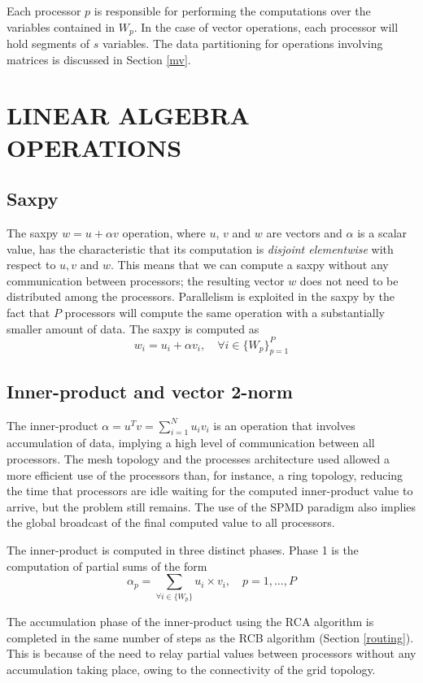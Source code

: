\documentclass{ecai2014}
\begin{document}
Each processor $p$ is responsible for performing the computations over
the variables contained in $W_{p}$. In the case of vector operations,
each processor will hold segments of $s$ variables. The data
partitioning for operations involving matrices is discussed in Section
\ref{mv}.
\section{LINEAR ALGEBRA OPERATIONS}
\label{blas}
\subsection{Saxpy}
\label{saxpy}
The saxpy $w=u+\alpha v$ operation, where $u$, $v$ and $w$ are vectors
and $\alpha$ is a scalar value, has the characteristic that its
computation is \emph{disjoint elementwise} with respect to $u, v$ and
$w$. This means that we can compute a saxpy without any communication
between processors; the resulting vector $w$ does not need to be
distributed among the processors. Parallelism is exploited in the
saxpy by the fact that $P$ processors will compute the same operation
with a substantially smaller amount of data. The saxpy is computed as
\begin{equation}
w_{i}=u_{i}+\alpha v_{i},\quad \forall i\in\{W_{p}\}_{p=1}^{P}
\label{distsaxpy}
\end{equation}
\subsection{Inner-product and vector 2-norm}
\label{utv}
The inner-product $\alpha=u^{T}v=\sum_{i=1}^{N}{u_{i}v_{i}}$ is an
operation that involves accumulation of data, implying a high level of
communication between all processors. The mesh topology and the
processes architecture used allowed a more efficient use of the
processors than, for instance, a ring topology, reducing the time that
processors are idle waiting for the computed inner-product value to
arrive, but the problem still remains. The use of the SPMD paradigm
also implies the global broadcast of the final computed value to all
processors.

The inner-product is computed in three distinct phases. Phase 1 is the
computation of partial sums of the form
\begin{equation}
\alpha_{p}=\sum_{\forall i\in\{W_{p}\}}{u_{i}\times v_{i}},\quad p=1,\ldots,P
\label{distutv}
\end{equation}

The accumulation phase of the inner-product using the RCA algorithm is
completed in the same number of steps as the RCB algorithm (Section
\ref{routing}). This is because of the need to relay partial values
between processors without any accumulation taking place, owing to the
connectivity of the grid topology.
\end{document}
